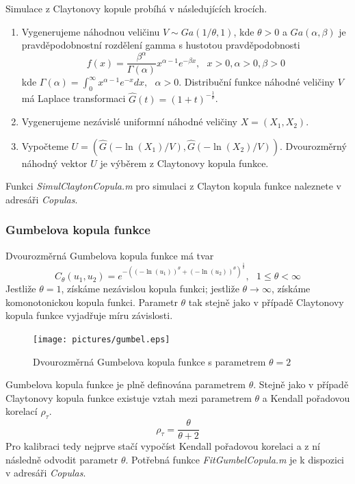 Simulace z Claytonovy kopule probíhá v následujících krocích.
\begin{enumerate}
\item Vygenerujeme náhodnou veličinu $V \sim Ga(1/\theta, 1)$, kde $\theta > 0$ a $Ga(\alpha, \beta)$ je pravděpodobnostní rozdělení gamma s hustotou pravděpodobnosti
\begin{equation*}
f(x) = \frac{\beta^{\alpha}}{\Gamma(\alpha)}x^{\alpha - 1}e^{-\beta x}, ~~~ x > 0, \alpha > 0, \beta > 0
\end{equation*}
kde $\Gamma(\alpha) = \int_0^{\infty} x^{\alpha - 1}e^{-x}dx, ~~~ \alpha > 0$. Distribuční funkce náhodné veličiny $V$ má Laplace transformaci $\hat{G}(t) = (1 + t) ^ {-\frac{1}{\theta}}$.
\item Vygenerujeme nezávislé uniformní náhodné veličiny $X = (X_1, X_2)$.
\item Vypočteme $U = \left(\hat{G}(-\ln(X_1)/V), \hat{G}(-\ln(X_2)/V)\right)$. Dvourozměrný náhodný vektor $U$ je výběrem z Claytonovy kopula funkce.
\end{enumerate}
Funkci \textit{SimulClaytonCopula.m} pro simulaci z Clayton kopula funkce naleznete v adresáři \textit{Copulas}.

\subsubsection{Gumbelova kopula funkce}

Dvourozměrná Gumbelova kopula funkce má tvar
\begin{equation*}
C_{\theta}(u_1, u_2) = e^{-\left((-\ln(u_1))^{\theta} + (-\ln(u_2))^{\theta}\right)^{\frac{1}{\theta}}}, ~~~ 1 \le \theta < \infty
\end{equation*}
Jestliže $\theta = 1$, získáme nezávislou kopula funkci; jestliže $\theta \rightarrow \infty$, získáme komonotonickou kopula funkci. Parametr $\theta$ tak stejně jako v případě Claytonovy kopula funkce vyjadřuje míru závislosti.

\begin{figure}[htp]
\centering
\texttt{[image: pictures/gumbel.eps]}
\caption{Dvourozměrná Gumbelova kopula funkce s parametrem $\theta = 2$}
\end{figure}

Gumbelova kopula funkce je plně definována parametrem $\theta$. Stejně jako v případě Claytonovy kopula funkce existuje vztah mezi parametrem $\theta$ a Kendall pořadovou korelací $\rho_{\tau}$.
\begin{equation*}
\rho_{\tau} = \frac{\theta}{\theta + 2}
\end{equation*}
Pro kalibraci tedy nejprve stačí vypočíst Kendall pořadovou korelaci a z ní následně odvodit parametr $\theta$. Potřebná funkce \textit{FitGumbelCopula.m} je k dispozici v adresáři \textit{Copulas}.

